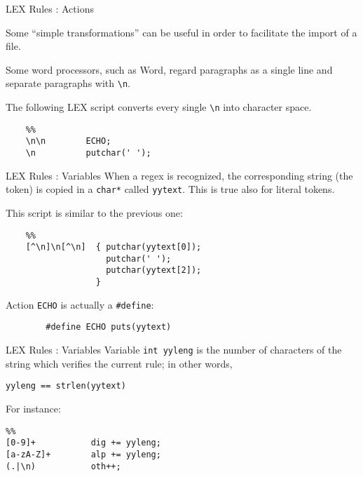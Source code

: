 \begin{frame}[fragile]{LEX Rules : Actions}

Some ``simple transformations'' can be useful in order
to facilitate the import of a file.


\vspace{20pt}

Some word processors, such as Word, regard paragraphs as a single line and
separate paragraphs with \verb"\n".


\vspace{20pt}

The following LEX script converts every single  \verb"\n" into character space.

\begin{verbatim}
    %%
    \n\n        ECHO;
    \n          putchar(' ');
\end{verbatim}


\end{frame}
\begin{frame}[fragile]{LEX Rules : Variables}
When a regex is recognized, the corresponding string (the token)
is copied in a 
{\tt char*} called {\tt yytext}.
This is true also for literal tokens.


\vspace{20pt}

This script is similar to the previous one:
\begin{verbatim}
    %%
    [^\n]\n[^\n]  { putchar(yytext[0]);
                    putchar(' ');
                    putchar(yytext[2]);
                  }
\end{verbatim}


\vspace{20pt}

Action {\tt ECHO} is actually a {\tt \#define}:
\begin{verbatim}
        #define ECHO puts(yytext)
\end{verbatim}



\end{frame}
\begin{frame}[fragile]{LEX Rules : Variables}
Variable
{\tt int yyleng} is the number of characters of the string
which verifies the current rule; in other words,
\begin{center}\tt yyleng == strlen(yytext)\end{center}


\vspace{20pt}

For instance:\label{digalpoth}
\begin{verbatim}
%%
[0-9]+           dig += yyleng;
[a-zA-Z]+        alp += yyleng;
(.|\n)           oth++;
\end{verbatim}

\end{frame}
